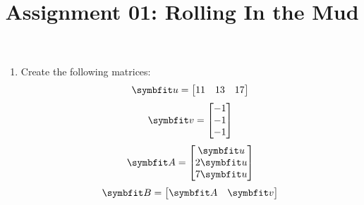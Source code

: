 \documentclass{article}
\title{Assignment 01: Rolling In the Mud}
\begin{document}
\renderTitle

\begin{enumerate}[leftmargin=*]
	\item
		Create the following matrices:
		\begin{equation}
			\mat{u} =
			\begin{bmatrix}
				11 & 13 & 17
			\end{bmatrix}
		\end{equation}
		\begin{equation}
			\mat{v} =
			\begin{bmatrix}
				-1 \\
				-1 \\
				-1 \\
			\end{bmatrix}
		\end{equation}
		\begin{equation}
			\mat{A} =
			\begin{bmatrix}
				\mat{u}  \\
				2\mat{u} \\
				7\mat{u} \\
			\end{bmatrix}
		\end{equation}
		\begin{equation}
			\mat{B} =
			\begin{bmatrix}
				\mat{A} & \mat{v}
			\end{bmatrix}
		\end{equation}
\end{enumerate}
\end{document}
